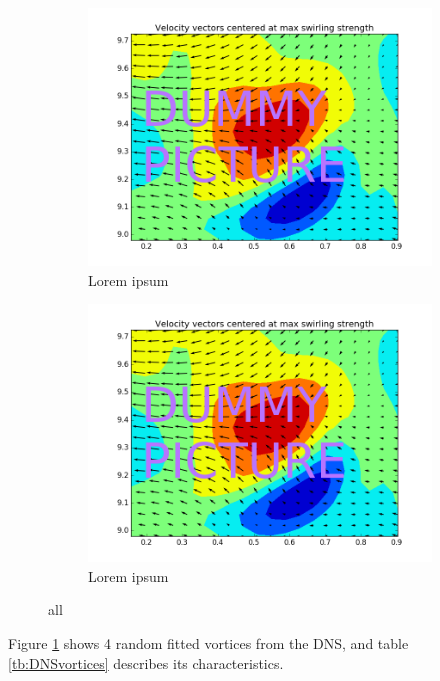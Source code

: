\documentclass[12pt, a4paper, openany]{memoir}
\begin{document}
\begin{figure}[h!]
\begin{subfigure}[b]{0.4\textwidth}
		\centering
		\includegraphics[width=\textwidth]{figure/dummy.png}
		\caption{Lorem ipsum}
	\end{subfigure}
	\begin{subfigure}[b]{0.4\textwidth}
		\centering
		\includegraphics[width=\textwidth]{figure/dummy.png}
		\caption{Lorem ipsum}
	\end{subfigure}
	\caption{all}
	\label{fig:vorticesDNS}
\end{figure}

Figure \ref{fig:vorticesDNS} shows 4 random fitted vortices from the DNS, and table \ref{tb:DNSvortices} describes its characteristics.
\end{document}
